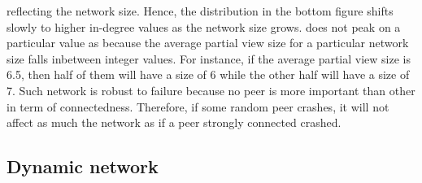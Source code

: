 \begin{asparadesc}
  reflecting the network size. Hence, the distribution in the bottom figure
  shifts slowly to higher in-degree values as the network size grows.  \SPRAY
  does not peak on a particular value as \CYCLON because the average partial
  view size for a particular network size falls inbetween integer values. For
  instance, if the average partial view size is 6.5, then half of them will
  have a size of 6 while the other half will have a size of 7. Such network is
  robust to failure because no peer is more important than other in term of
  connectedness. Therefore, if some random peer crashes, it will not affect as
  much the network as if a peer strongly connected crashed.
\end{asparadesc}

\subsection{Dynamic network}


